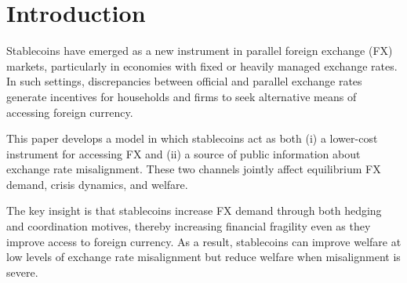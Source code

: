 \section{Introduction}

Stablecoins have emerged as a new instrument in parallel foreign exchange (FX) markets, particularly in economies with fixed or heavily managed exchange rates. In such settings, discrepancies between official and parallel exchange rates generate incentives for households and firms to seek alternative means of accessing foreign currency.

This paper develops a model in which stablecoins act as both (i) a lower-cost instrument for accessing FX and (ii) a source of public information about exchange rate misalignment. These two channels jointly affect equilibrium FX demand, crisis dynamics, and welfare.

The key insight is that stablecoins increase FX demand through both hedging and coordination motives, thereby increasing financial fragility even as they improve access to foreign currency. As a result, stablecoins can improve welfare at low levels of exchange rate misalignment but reduce welfare when misalignment is severe.
